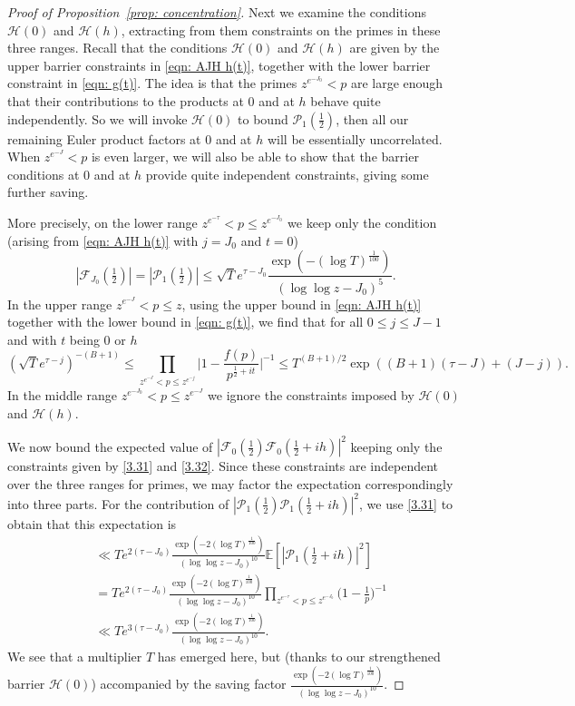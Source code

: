 \documentclass[12pt, notitlepage]{amsart}
\numberwithin{equation}{section}
\def\E{\mathbb E}
\theoremstyle{remark}
\theoremstyle{definition}
\theoremstyle{remark}
\numberwithin{equation}{section}
\begin{document}
\begin{proof}[Proof of Proposition~\ref{prop: concentration}]
Next we examine the conditions ${\mathcal H}(0)$ and ${\mathcal H}(h)$, extracting from them constraints on the primes in these three ranges.  Recall that the conditions ${\mathcal H}(0)$ and ${\mathcal H}(h)$ are given by the upper barrier constraints in \eqref{eqn: AJH h(t)}, together with the lower barrier constraint in \eqref{eqn: g(t)}. The idea is that the primes $z^{e^{-J_0}} < p$ are large enough that their contributions to the products at 0 and at $h$ behave quite independently. So we will invoke ${\mathcal H}(0)$ to bound ${\mathcal P}_1(\tfrac 12)$, then all our remaining Euler product factors at 0 and at $h$ will be essentially uncorrelated. When $z^{e^{-J}} < p$ is even larger, we will also be able to show that the barrier conditions at 0 and at $h$ provide quite independent constraints, giving some further saving.

More precisely, on the lower range $z^{e^{-\tau}} < p \le z^{e^{-J_0}}$ we keep only the condition (arising from \eqref{eqn: AJH h(t)} with $j=J_0$ and $t=0$) 
\begin{equation} 
\label{3.31} 
|{\mathcal F}_{J_0}(\tfrac 12)| = |{\mathcal P}_1(\tfrac 12)| \le \sqrt{T} e^{\tau -J_0} \frac{\exp(-(\log T)^{\frac 1{100}})}{(\log \log z -J_0)^5}. 
\end{equation} 
In the upper range $z^{e^{-J}}< p \le z$, using the upper bound in \eqref{eqn: AJH h(t)} together with the lower bound in \eqref{eqn: g(t)}, we find that for all $0\le j\le J-1$  and with $t$ being $0$ or $h$ 
\begin{equation} 
 \label{3.32} 
(\sqrt{T} e^{\tau-j})^{-(B+1)} \le  \prod_{z^{e^{-J}}< p \le z^{e^{-j}}} \Big|1- \frac{f(p)}{p^{\frac 12+it}}\Big|^{-1}\le T^{(B+1)/2} \exp((B+1)(\tau-J) + (J-j)). 
\end{equation}
In the middle range $z^{e^{-J_0}}<p\le z^{e^{-J}}$ we ignore the constraints imposed by ${\mathcal H}(0)$ and ${\mathcal H}(h)$.  

We now bound the expected value of $|{\mathcal F}_0(\tfrac 12) {\mathcal F}_0(\tfrac 12+ih)|^2$ keeping only the constraints given by \eqref{3.31} and \eqref{3.32}.   Since these constraints are independent over the three ranges for primes, we may factor the expectation correspondingly into three parts.  For the contribution of $|{\mathcal P}_1(\tfrac 12){\mathcal P}_1(\tfrac 12+ih)|^2$, we use \eqref{3.31} to obtain that this expectation is 
\begin{align}
\label{3.33} 
&\ll T e^{2(\tau-J_0)} \frac{\exp(-2(\log T)^{\frac 1{100}})}{(\log \log z-J_0)^{10}} \E[|{\mathcal P}_1(\tfrac 12+ih)|^2] \nonumber \\
&=    T e^{2(\tau-J_0)} \frac{\exp(-2(\log T)^{\frac 1{100}})}{(\log \log z-J_0)^{10}} \prod_{z^{e^{-\tau}}<p \le z^{e^{-J_0}}} \Big(1-\frac 1p\Big)^{-1}  \nonumber\\
&\ll T e^{3(\tau-J_0)}  \frac{\exp(-2(\log T)^{\frac 1{100}})}{(\log \log z-J_0)^{10}}.
\end{align} 
We see that a multiplier $T$ has emerged here, but (thanks to our strengthened barrier ${\mathcal H}(0)$) accompanied by the saving factor $\frac{\exp(-2(\log T)^{\frac 1{100}})}{(\log \log z-J_0)^{10}}$.


\end{proof}
\end{document}
